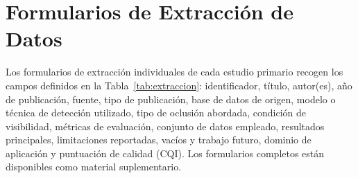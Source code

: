 \documentclass[12pt, a4paper]{article}
\begin{document}
\section{Formularios de Extracci\'{o}n de Datos}

Los formularios de extracci\'{o}n individuales de cada estudio
primario recogen los campos definidos en la
Tabla~\ref{tab:extraccion}: identificador, t\'{i}tulo, autor(es),
a\~{n}o de publicaci\'{o}n, fuente, tipo de publicaci\'{o}n, base de
datos de origen, modelo o t\'{e}cnica de detecci\'{o}n utilizado,
tipo de oclusi\'{o}n abordada, condici\'{o}n de visibilidad,
m\'{e}tricas de evaluaci\'{o}n, conjunto de datos empleado,
resultados principales, limitaciones reportadas, vac\'{i}os y trabajo
futuro, dominio de aplicaci\'{o}n y puntuaci\'{o}n de calidad (CQI).
Los formularios completos est\'{a}n disponibles como material
suplementario.
\end{document}

